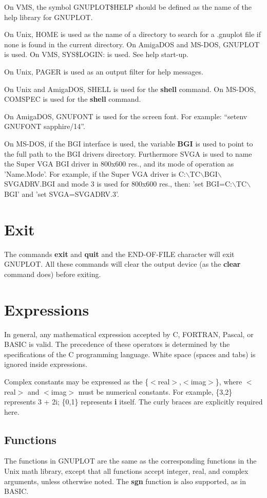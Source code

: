 On VMS, the symbol GNUPLOT\$HELP should be defined as the name of 
the help library for GNUPLOT.

On Unix, HOME is used as the name of a directory to search for 
a .gnuplot file if none is found in the current directory.
On AmigaDOS and MS-DOS, GNUPLOT is used. On VMS, SYS\$LOGIN: is used.
See help start-up.

On Unix, PAGER is used as an output filter for help messages.

On Unix and AmigaDOS, SHELL is used for the {\bf shell} command. On MS-DOS,
COMSPEC is used for the {\bf shell} command.

On AmigaDOS, GNUFONT is used for the screen font.  For example:
``setenv GNUFONT sapphire/14''.

On MS-DOS, if the BGI interface is used, the variable {\bf BGI} is used to point 
to the full path to the BGI drivers directory. Furthermore SVGA is used to
name the Super VGA BGI driver in 800x600 res., and its mode of operation
as 'Name.Mode'.
For example, if the Super VGA driver is C:$\backslash$TC$\backslash$BGI$\backslash$SVGADRV.BGI and mode 3 is
used for 800x600 res., then: 'set BGI=C:$\backslash$TC$\backslash$BGI' and 'set SVGA=SVGADRV.3'.
\section{Exit}
The commands {\bf exit} and {\bf quit} and the END-OF-FILE character
will exit GNUPLOT. All these commands will clear the output device
(as the {\bf clear} command does) before exiting.
\section{Expressions}
In general, any mathematical expression accepted by C, FORTRAN,
Pascal, or BASIC is valid. The precedence of these operators is
determined by the specifications of the C programming language.
White space (spaces and tabs) is ignored inside expressions.

Complex constants may be expressed as the \{$<$real$>$,$<$imag$>$\}, where $<$real$>$
and $<$imag$>$ must be numerical constants. For example, \{3,2\}
represents 3 + 2i; \{0,1\} represents {\bf i} itself. The curly braces 
are explicitly required here.
\subsection{Functions}
The functions in GNUPLOT are the same as the corresponding functions
in the Unix math library, except that all functions accept integer,
real, and complex arguments, unless otherwise noted. The {\bf sgn}
function is also supported, as in BASIC.

